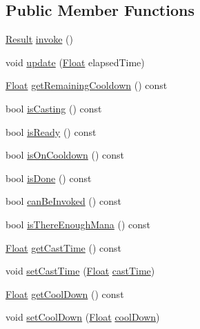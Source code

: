 \subsection*{Public Member Functions}
\begin{DoxyCompactItemize}
\item 
\hyperlink{classZeta_1_1Ability_acbc80e4d82c9683d190ed8ca1c80f597}{Result} \hyperlink{classZeta_1_1ActiveAbility_a46023874b199a7bdb565e9183b9ac2a5}{invoke} ()
\item 
void \hyperlink{classZeta_1_1ActiveAbility_a2fd33f973a6465e2676f96e801c876a5}{update} (\hyperlink{namespaceZeta_a1e0a1265f9b3bd3075fb0fabd39088ba}{Float} elapsed\+Time)
\item 
\hyperlink{namespaceZeta_a1e0a1265f9b3bd3075fb0fabd39088ba}{Float} \hyperlink{classZeta_1_1ActiveAbility_a439a4383db68777ee0c470ba2b0cdb9e}{get\+Remaining\+Cooldown} () const 
\item 
bool \hyperlink{classZeta_1_1ActiveAbility_a4dc0971df65c51832aa66a19ea633975}{is\+Casting} () const 
\item 
bool \hyperlink{classZeta_1_1ActiveAbility_a9fb0208b07148ac22c4315cf3be019d5}{is\+Ready} () const 
\item 
bool \hyperlink{classZeta_1_1ActiveAbility_a123c7db247dd64d0d313c256c35d5672}{is\+On\+Cooldown} () const 
\item 
bool \hyperlink{classZeta_1_1ActiveAbility_abf8bed3dae7891ec6edf3017f8ae0f6e}{is\+Done} () const 
\item 
bool \hyperlink{classZeta_1_1ActiveAbility_a412dc4526b26c5bab6550bcfd51cb115}{can\+Be\+Invoked} () const 
\item 
bool \hyperlink{classZeta_1_1ActiveAbility_a27e34f191cc69b670b0d3bd098c1e840}{is\+There\+Enough\+Mana} () const 
\item 
\hyperlink{namespaceZeta_a1e0a1265f9b3bd3075fb0fabd39088ba}{Float} \hyperlink{classZeta_1_1ActiveAbility_aa6498ca1448a63c2a10b635f095f8647}{get\+Cast\+Time} () const 
\item 
void \hyperlink{classZeta_1_1ActiveAbility_a326fbed7538adc7f7757b677c62a428e}{set\+Cast\+Time} (\hyperlink{namespaceZeta_a1e0a1265f9b3bd3075fb0fabd39088ba}{Float} \hyperlink{classZeta_1_1ActiveAbility_ab501566943e05f567f2d79426cf04e84}{cast\+Time})
\item 
\hyperlink{namespaceZeta_a1e0a1265f9b3bd3075fb0fabd39088ba}{Float} \hyperlink{classZeta_1_1ActiveAbility_add329505b459888d51b06f130a99e539}{get\+Cool\+Down} () const 
\item 
void \hyperlink{classZeta_1_1ActiveAbility_afc40cf0dda0f01a908b6e11e60e391ef}{set\+Cool\+Down} (\hyperlink{namespaceZeta_a1e0a1265f9b3bd3075fb0fabd39088ba}{Float} \hyperlink{classZeta_1_1ActiveAbility_ac4948af3377c964955adce51f87fb7f7}{cool\+Down})

\end{DoxyCompactItemize}
